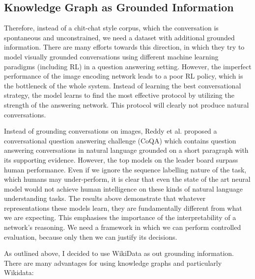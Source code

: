 \documentclass[bsc,frontabs,twoside,singlespacing,parskip,deptreport]{infthesis}     %
\begin{document}
\subsection{Knowledge Graph as Grounded Information}


Therefore, instead of a chit-chat style corpus, which the conversation is spontaneous and unconstrained, we need a dataset with additional grounded information. There are many efforts towards this direction\cite{strub2017end}\cite{shekhar2017foil}\cite{reddy2019coqa}\cite{zhou2018dataset}\cite{de2017guesswhat}\cite{das2017visual}\cite{das2017learning}, in which they try to model visually grounded conversations using different machine learning paradigms (including RL) in a question answering setting. However, the imperfect performance of the image encoding network leads to a poor RL policy, which is the bottleneck of the whole system. Instead of learning the best conversational strategy, the model learns to find the most effective protocol by utilizing the strength of the answering network. This protocol will clearly not produce natural conversations.

Instead of grounding conversations on images, Reddy et al.\cite{reddy2019coqa} proposed a conversational question answering challenge (CoQA) which contains question answering conversations in natural language grounded on a short paragraph with its supporting evidence. However, the top models on the leader board surpass human performance. Even if we ignore the sequence labelling nature of the task, which humans may under-perform, it is clear that even the state of the art neural model would not achieve human intelligence on these kinds of natural language understanding tasks. The results above demonstrate that whatever representations these models learn, they are fundamentally different from what we are expecting. This emphasises the importance of the interpretability of a network's reasoning. We need a framework in which we can perform controlled evaluation, because only then we can justify its decisions.

As outlined above, I decided to use WikiData\cite{vrandevcic2014wikidata} as out grounding information. There are many advantages for using knowledge graphs and particularly Wikidata:
\end{document}
